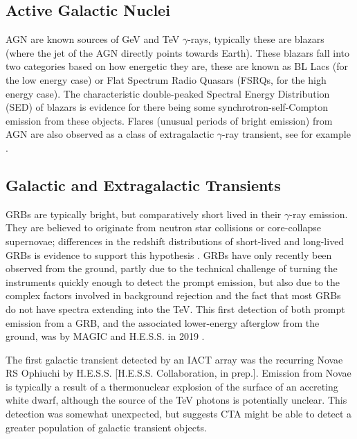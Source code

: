 \subsection{Active Galactic Nuclei}
AGN are known sources of GeV and TeV $\gamma$-rays, typically these are blazars (where the jet of the AGN directly points towards Earth). These blazars fall into two categories based on how energetic they are, these are known as BL Lacs (for the low energy case) or Flat Spectrum Radio Quasars (FSRQs, for the high energy case). The characteristic double-peaked Spectral Energy Distribution (SED) of blazars is evidence for there being some synchrotron-self-Compton emission from these objects. Flares (unusual periods of bright emission) from AGN are also observed as a class of extragalactic $\gamma$-ray transient, see for example \cite{TXS}.

\subsection{Galactic and Extragalactic Transients}
GRBs are typically bright, but comparatively short lived in their $\gamma$-ray emission. They are believed to originate from neutron star collisions or core-collapse supernovae; differences in the redshift distributions of short-lived and long-lived GRBs is evidence to support this hypothesis \cite{longair}. GRBs have only recently been observed from the ground, partly due to the technical challenge of turning the instruments quickly enough to detect the prompt emission, but also due to the complex factors involved in background rejection and the fact that most GRBs do not have spectra extending into the TeV. This first detection of both prompt emission from a GRB, and the associated lower-energy afterglow from the ground, was by MAGIC and H.E.S.S. in 2019 \cite{magicGRB}.

The first galactic transient detected by an IACT array was the recurring Novae RS Ophiuchi by H.E.S.S. [H.E.S.S. Collaboration, in prep.]. Emission from Novae is typically a result of a thermonuclear explosion of the surface of an accreting white dwarf, although the source of the TeV photons is potentially unclear. This detection was somewhat unexpected, but suggests CTA might be able to detect a greater population of galactic transient objects.

